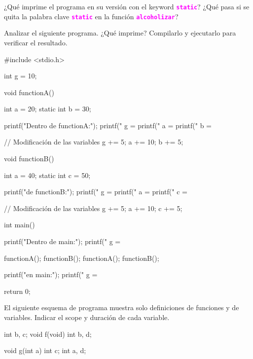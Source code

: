 \documentclass[]{scrartcl}
\newcommand{\hl}[1]{\textcolor{magenta}{\textbf{\texttt{#1}}}}
\begin{document}
\begin{exbox}
  ¿Qué imprime el programa en su versión con el keyword \hl{static}? ¿Qué pasa si se quita la palabra clave \hl{static} en la función \hl{alcoholizar}?
\end{exbox}

\begin{exbox}
  Analizar el siguiente programa. ¿Qué imprime? Compilarlo y ejecutarlo para verificar el resultado.
  \begin{ccode}
  #include <stdio.h>

  int g = 10;  
  
  void functionA() {
      int a = 20;  
      static int b = 30;  
  
      printf("Dentro de functionA:\n");
      printf("  g = %
      printf("  a = %
      printf("  b = %
  
      // Modificación de las variables
      g += 5;  
      a += 10;
      b += 5;
  }
  
  void functionB() {
      int a = 40;
      static int c = 50;  
  
      printf("\nDentro de functionB:\n");
      printf("  g = %
      printf("  a = %
      printf("  c = %
  
      // Modificación de las variables
      g += 5;
      a += 10;
      c += 5;
  }
  
  int main() {
      printf("Dentro de main:\n");
      printf("  g = %
  
      functionA();
      functionB();
      functionA();
      functionB();
  
      printf("\nFinal en main:\n");
      printf("  g = %
  
      return 0;
  }
  \end{ccode}
\end{exbox}

\begin{exbox}[]
El siguiente esquema de programa muestra solo definiciones de funciones y de variables. Indicar el scope y duración de cada variable. 

\begin{ccode}
  int b, c;
  void f(void)
  {
    int b, d;
  }

  void g(int a)
  {
    int c;
    {
      int a, d;
    }
  }
\end{ccode}

\end{exbox}
\end{document}
